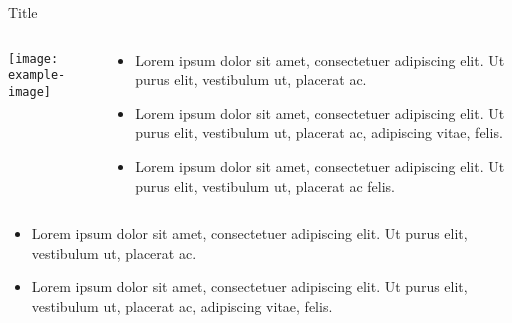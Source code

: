 \documentclass[10pt]{beamer}
\begin{document}
\begin{frame}{Title}
    \begin{columns}[b, onlytextwidth]
        \begin{column}{.4\textwidth}
            \texttt{[image: example-image]}
        \end{column}
        \begin{column}{.58\textwidth}
            \begin{itemize}
            \item Lorem ipsum dolor sit amet, consectetuer adipiscing elit. Ut purus elit, vestibulum ut, placerat ac.
            \item Lorem ipsum dolor sit amet, consectetuer adipiscing elit. Ut purus elit, vestibulum ut, placerat ac, adipiscing vitae, felis.
            \item Lorem ipsum dolor sit amet, consectetuer adipiscing elit. Ut purus elit, vestibulum ut, placerat ac felis.
            \end{itemize}
        \end{column}
    \end{columns}
    \begin{itemize}
        \item Lorem ipsum dolor sit amet, consectetuer adipiscing elit. Ut purus elit, vestibulum ut, placerat ac.
        \item Lorem ipsum dolor sit amet, consectetuer adipiscing elit. Ut purus elit, vestibulum ut, placerat ac, adipiscing vitae, felis.
    \end{itemize}
\end{frame}
\end{document}
